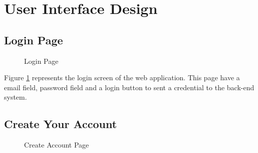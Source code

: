 \documentclass[12pt,oneside,openright,a4paper]{cpe-english-project}
\begin{document}
\newpage
\section{User Interface Design}

\subsection{Login Page}

\begin{figure}[!h]
\centering
{}
\caption{Login Page}\label{fig:login}
\end{figure}

Figure \ref{fig:login} represents the login screen of the web application. This page have a email field,  password field and a login button to sent a credential to the back-end system. 

\subsection{Create Your Account }

\begin{figure}[!h]
\centering
{}
\caption{Create Account Page}\label{fig:create-acc}
\end{figure}
\end{document}
